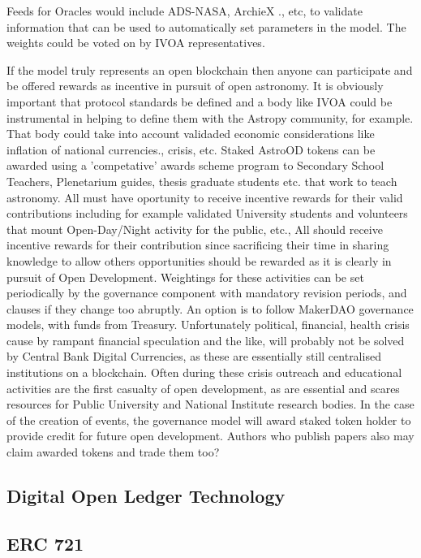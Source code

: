 \documentclass[final,5p,times,twocolumn,authoryear]{elsarticle}
\begin{document}
Feeds for Oracles would include ADS-NASA, ArchieX ., etc,  to validate information that can be used to automatically set parameters in the model. The weights could be voted on by IVOA representatives.

If the  model truly represents an open blockchain then anyone can participate and be offered rewards as incentive in pursuit of open astronomy. It is obviously important that protocol standards be defined and a body like IVOA could be instrumental in helping to define them with the Astropy community, for example. That body could take into account validaded economic considerations like inflation of national currencies., crisis, etc. Staked AstroOD tokens can be awarded using a 'competative' awards scheme program to Secondary School Teachers, Plenetarium guides, thesis graduate students etc. that work to teach astronomy. All must have oportunity to receive incentive rewards for their valid contributions including for example validated University students and volunteers that mount Open-Day/Night activity for the public, etc., All should receive incentive rewards for their contribution since sacrificing their time in sharing knowledge to allow others opportunities should be rewarded as it is clearly in pursuit of Open Development. Weightings for these activities can be set periodically by the governance component with mandatory revision periods, and clauses if they change too abruptly. An option is to follow MakerDAO governance models, with funds from Treasury. Unfortunately political, financial, health  crisis cause by rampant financial speculation and the like, will probably not be solved by Central Bank Digital Currencies, as these are essentially still centralised institutions on a blockchain.  Often during these crisis outreach and educational activities are the first casualty of open development, as are essential and scares resources for Public University and National Institute research bodies. In the case of the creation of events, the governance model will award staked token holder to provide credit for future open development. Authors who publish papers also may claim awarded tokens and trade them too?

\subsection{Digital Open Ledger Technology}

\subsection{ERC 721 }
\end{document}

